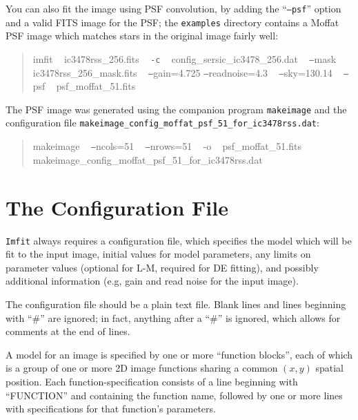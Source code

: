 \documentclass[10pt]{article}
\newcommand{\makeimage}{\texttt{makeimage}}
\begin{document}
You can also fit the image using PSF convolution, by adding the ``\texttt{--psf}'' option and a
valid FITS image for the PSF; the \texttt{examples} directory contains a Moffat PSF image which
matches stars in the original image fairly well:
\begin{quote}
imfit ~ ic3478rss\_256.fits ~ \texttt{-c} ~ config\_sersic\_ic3478\_256.dat ~ \texttt{--}mask ~ ic3478rss\_256\_mask.fits ~ \texttt{--}gain=4.725 \texttt{--}readnoise=4.3 ~ \texttt{--}sky=130.14 ~ \texttt{--}psf ~ psf\_moffat\_51.fits
\end{quote}


The PSF image was generated using the companion program \makeimage{} and the configuration
file \texttt{makeimage\_config\_moffat\_psf\_51\_for\_ic3478rss.dat}:
\begin{quote}
makeimage ~ \texttt{--}ncols=51 ~ \texttt{--}nrows=51 ~ -o ~ psf\_moffat\_51.fits ~ makeimage\_config\_moffat\_psf\_51\_for\_ic3478rss.dat  
\end{quote}



\section{The Configuration File}\label{sec:configfile}

\texttt{Imfit} always requires a configuration file, which specifies the
model which will be fit to the input image, initial values for model parameters, any limits on
parameter values (optional for L-M, required for DE fitting), and
possibly additional information (e.g, gain and read noise for the
input image).

The configuration file should be a plain text file. Blank lines and
lines beginning with ``\#'' are ignored; in fact, anything after a
``\#'' is ignored, which allows for comments at the end of lines.

A model for an image is specified by one or more ``function blocks'',
each of which is a group of one or more 2D image functions sharing a
common $(x,y)$ spatial position. Each function-specification consists of
a line beginning with ``FUNCTION'' and containing the function name,
followed by one or more lines with specifications for that function's parameters.

\bigskip
\end{document}
